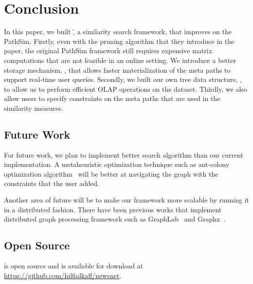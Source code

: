 \section{Conclusion}
\label{sec:conc}

In this paper, we built \h, a similarity search framework, that improves on the
PathSim. Firstly, even with the pruning algorithm that they introduce in the
paper, the original PathSim framework still requires expensive matrix
computations that are not feasible in an online setting. We introduce a better
storage mechanism, \mTable, that allows faster materialization of the meta
paths to support real-time user queries. Secondly, we built our own tree data
structure, \hTable, to allow us to perform efficient OLAP operations on the
dataset. Thirdly, we also allow users to specify constraints on the meta paths
that are used in the similarity measures.

\subsection{Future Work}

For future work, we plan to implement better search algorithm than our current
implementation. A metaheuristic optimization technique such as ant-colony
optimization algorithm~\cite{dorigo1997ant} will be better at navigating the
graph with the constraints that the user added.

Another area of future will be to make our framework more scalable by running
it in a distributed fashion. There have been previous works that implement
distributed graph processing framework such as GraphLab~\cite{low2010graphlab}
and Graphx~\cite{xin2013graphx}.

\subsection{Open Source}

\h is open source and is available for download at
\url{https://github.com/hilfialkaff/newsnet}.
